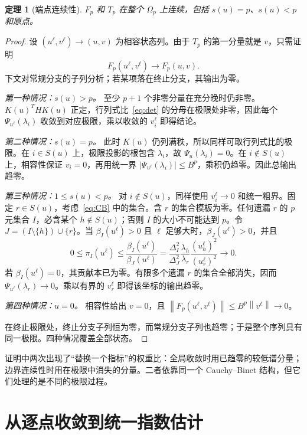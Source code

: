 \documentclass[UTF8,zihao=-4,a4paper]{ctexart}
\newtheorem{theorem}{定理}[section]
\theoremstyle{definition}\newtheorem{example}[theorem]{例}
\newcommand{\norm}[1]{\left\lVert#1\right\rVert}
\begin{document}
\begin{theorem}[端点连续性]\label{thm:continuous}
$F_p$ 和 $T_p$ 在整个 $\Omega_p$ 上连续，包括 $s(u)=p$、$s(u)<p$ 和原点。
\end{theorem}
\begin{proof}
设 $(u^\ell,v^\ell)\to(u,v)$ 为相容状态列。由于 $T_p$ 的第一分量就是 $v$，只需证明\[F_p(u^\ell,v^\ell)\longrightarrow F_p(u,v).\]下文对常规分支的子列分析；若某项落在终止分支，其输出为零。

\emph{第一种情况：$s(u)>p$。} 至少 $p+1$ 个非零分量在充分晚时仍非零。$K(u)^THK(u)$ 正定，行列式比~\eqref{eq:det} 的分母在极限处非零，因此每个 $\Psi_{u^\ell}(\lambda_i)$ 收敛到对应极限，乘以收敛的 $v_i^\ell$ 即得结论。

\emph{第二种情况：$s(u)=p$。} 此时 $K(u)$ 仍列满秩，所以同样可取行列式比的极限。在 $i\in S(u)$ 上，极限投影的根包含 $\lambda_i$，故 $\Psi_u(\lambda_i)=0$。在 $i\notin S(u)$ 上，相容性保证 $v_i=0$，再用统一界
$|\Psi_{u^\ell}(\lambda_i)|\le B^p$，乘积仍趋零。因此总输出趋零。

\emph{第三种情况：$1\le s(u)<p$。} 对 $i\notin S(u)$，同样使用 $v_i^\ell\to0$ 和统一粗界。固定 $r\in S(u)$，考虑~\eqref{eq:CB} 中的集合。含 $r$ 的集合模板为零。任何遗漏 $r$ 的 $p$ 元集合 $I$，必含某个 $h\notin S(u)$；否则 $I$ 的大小不可能达到 $p$。令 $J=(I\setminus\{h\})\cup\{r\}$。当 $\beta_I(u^\ell)>0$ 且 $\ell$ 足够大时，$\beta_J(u^\ell)>0$，并且
\begin{equation}\label{eq:boundaryratio}
 0\le\pi_I(u^\ell)\le\frac{\beta_I(u^\ell)}{\beta_J(u^\ell)}
 =\frac{\Delta_I^2}{\Delta_J^2}\frac{\lambda_h}{\lambda_r}
   \frac{(u_h^\ell)^2}{(u_r^\ell)^2}\longrightarrow0.
\end{equation}
若 $\beta_I(u^\ell)=0$，其贡献本已为零。有限多个遗漏 $r$ 的集合全部消失，因而
$\Psi_{u^\ell}(\lambda_r)\to0$。乘以有界的 $v_r^\ell$ 即得该坐标的输出趋零。

\emph{第四种情况：$u=0$。} 相容性给出 $v=0$，且
$\norm{F_p(u^\ell,v^\ell)}\le B^p\norm{v^\ell}\to0$。

在终止极限处，终止分支子列恒为零，而常规分支子列也趋零；于是整个序列具有同一极限。四种情况覆盖全部状态。
\end{proof}

证明中两次出现了“替换一个指标”的权重比：全局收敛时用已趋零的较低谱分量；边界连续性时用在极限中消失的分量。二者依靠同一个 Cauchy--Binet 结构，但它们处理的是不同的极限过程。

\section{从逐点收敛到统一指数估计}\label{sec:uniform}
\end{document}
